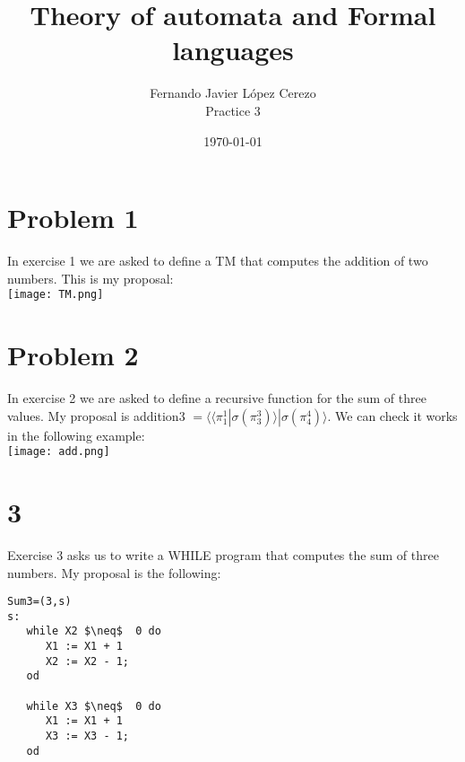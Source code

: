 \documentclass{article}
\title{Theory of automata and Formal languages}
\author{Fernando Javier López Cerezo \\ Practice 3}
\date{\today}
\begin{document}
\maketitle

\section*{Problem 1}
In exercise 1 we are asked to define a TM that computes the addition of two numbers. This is my proposal: \\ \texttt{[image: TM.png]} 

\section*{Problem 2}
In exercise 2 we are asked to define a recursive function for the sum of three values. My proposal is addition3 $= \langle\langle\pi^1_1|\sigma(\pi^3_3)\rangle|\sigma(\pi^4_4)\rangle$. We can check it works in the following example: \\ \texttt{[image: add.png]} 

\section*{3}
Exercise 3 asks us to write a WHILE program that computes the sum of three numbers. My proposal is the following: \begin{lstlisting}
Sum3=(3,s)
s:
   while X2 $\neq$  0 do
      X1 := X1 + 1
      X2 := X2 - 1;
   od
   
   while X3 $\neq$  0 do
      X1 := X1 + 1
      X3 := X3 - 1;
   od
    
	


\end{lstlisting}

\end{document}
